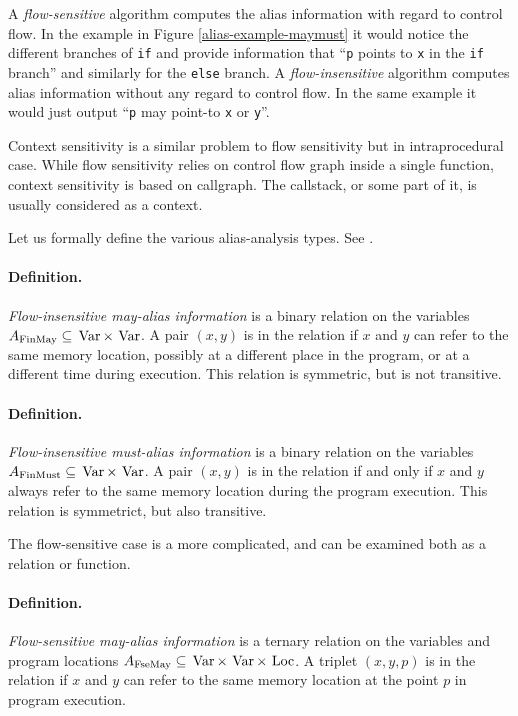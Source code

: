 A {\it flow-sensitive} algorithm computes the alias information with regard to control
flow. In the example in Figure \ref{alias-example-maymust} it would notice the
different branches of {\tt if} and provide information that ``{\tt p} points to
{\tt x} in the {\tt if} branch'' and similarly for the {\tt else} branch.
A {\it flow-insensitive} algorithm computes alias information without any regard
to control flow. In the same example it would just output ``{\tt p} may point-to
{\tt x} or {\tt y}''.

Context sensitivity is a similar problem to flow sensitivity but in
intraprocedural case. While flow sensitivity relies on control flow graph inside
a single function, context sensitivity is based on callgraph. The callstack, or
some part of it, is usually considered as a context.

Let us formally define the various alias-analysis
types. See \cite{muchnick1997advanced}.

\paragraph{Definition.} {\it Flow-insensitive may-alias information} is a binary
relation on the variables $A_{\mathrm{FinMay}} \subseteq \operatorname*{\,Var} \times \operatorname*{\,Var} $. A pair
$(x,y)$ is in the relation if $x$ and $y$ can refer to the same
memory location, possibly at a different place in the program, or at a different
time during execution. This relation is symmetric, but is not transitive.

\paragraph{Definition.} {\it Flow-insensitive must-alias information} is a binary
relation on the variables $A_{\mathrm{FinMust}} \subseteq \operatorname*{\,Var} \times \operatorname*{\,Var}$. A pair
$(x,y)$ is in the relation if and only if $x$ and $y$ always refer to the same
memory location during the program execution. This relation is symmetrict, but
also transitive. 

The flow-sensitive case is a more complicated, and can be examined both as a
relation or function.

\paragraph{Definition.} {\it Flow-sensitive may-alias information} is a ternary
relation on the variables and program locations $A_{\mathrm{FseMay}} \subseteq
\operatorname*{\,Var} \times \operatorname*{\,Var} \times \operatorname*{\,Loc}$. A triplet $(x,y,p)$ is in the relation if $x$
and $y$ can refer to the same memory location at the point $p$ in program
execution.

